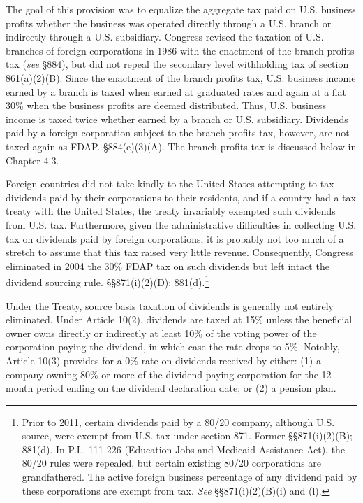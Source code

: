 The goal of this provision was to equalize the aggregate tax paid on U.S. business profits whether the business was operated directly through a U.S. branch or indirectly through a U.S. subsidiary.  Congress revised the taxation of U.S. branches of foreign corporations in 1986 with the enactment of the branch profits tax (\emph{see} \S884), but did not repeal the secondary level withholding tax of section 861(a)(2)(B).  Since the enactment of the branch profits tax, U.S. business income earned by a branch is taxed when earned at graduated rates and again at a flat 30\% when the business profits are deemed distributed.  Thus, U.S. business income is taxed twice whether earned by a branch or U.S. subsidiary.  Dividends paid by a foreign corporation subject to the branch profits tax, however, are not taxed again as FDAP.  \S884(e)(3)(A). The branch profits tax is discussed below in Chapter 4.3. 

Foreign countries did not take kindly to the United States attempting to tax dividends paid by their corporations to their residents, and if a country had a tax treaty with the United States, the treaty invariably exempted such dividends from U.S. tax.  Furthermore, given the administrative difficulties in collecting U.S. tax on dividends paid by foreign corporations, it is probably not too much of a stretch to assume that this tax raised very little revenue.  Consequently, Congress eliminated in 2004 the 30\% FDAP tax on such dividends but left intact the dividend sourcing rule. \S\S 871(i)(2)(D); 881(d).\footnote{Prior to 2011, certain dividends paid by a 80/20 company, although U.S. source, were exempt from U.S. tax under section 871.  Former \S\S 871(i)(2)(B); 881(d).  In P.L. 111-226 (Education Jobs and Medicaid Assistance Act), the 80/20 rules were repealed, but certain existing 80/20 corporations are grandfathered.  The active foreign business percentage of any dividend paid by these corporations are exempt from tax. \emph{See} \S\S871(i)(2)(B)(i) and (l).} 

Under the Treaty, source basis taxation of dividends is generally not entirely eliminated.  Under Article 10(2), dividends are taxed at 15\% unless the beneficial owner owns directly or indirectly at least 10\% of the voting power of the corporation paying the dividend, in which case the rate drops to 5\%.  Notably, Article 10(3) provides for a 0\% rate on dividends received by either: (1) a company owning 80\% or more of the dividend paying corporation for the 12-month period ending on the dividend declaration date; or (2) a pension plan.  

